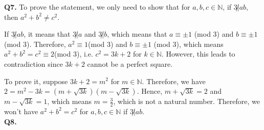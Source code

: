 \documentclass{article}[12pt]
\begin{document}
\noindent \textbf{Q7.}
To prove the statement, we only need to show that for $a,b,c\in \mathbb{N}$, if $3\not|ab$, then $a^2+b^2\not=c^2$. \par If $3\not|ab$, it means that $3\not|a$ and $3\not|b$, which means that $a\equiv \pm 1$ (mod 3) and $b\equiv \pm 1$ (mod 3). Therefore, $a^2\equiv 1$(mod 3) and $b\equiv \pm 1$ (mod 3), which means $a^2+b^2=c^2\equiv 2$(mod 3), i.e. $c^2=3k+2$ for $k\in \mathbb{N}$. However, this leads to contradiction since $3k+2$ cannot be a perfect square. \par To prove it, suppose $3k+2=m^2$ for $m\in \mathbb{N}$. Therefore, we have $2=m^2-3k=(m+\sqrt{3k})(m-\sqrt{3k})$. Hence, $m+\sqrt{3k}=2$ and $ m-\sqrt{3k} =1$, which means $ m=\frac{3}{2} $, which is not a natural number. Therefore, we won't have $ a^2+b^2=c^2 $ for $a,b,c\in \mathbb{N}$ if $3\not|ab$.
\\ 

\noindent \textbf{Q8.}
\end{document}
